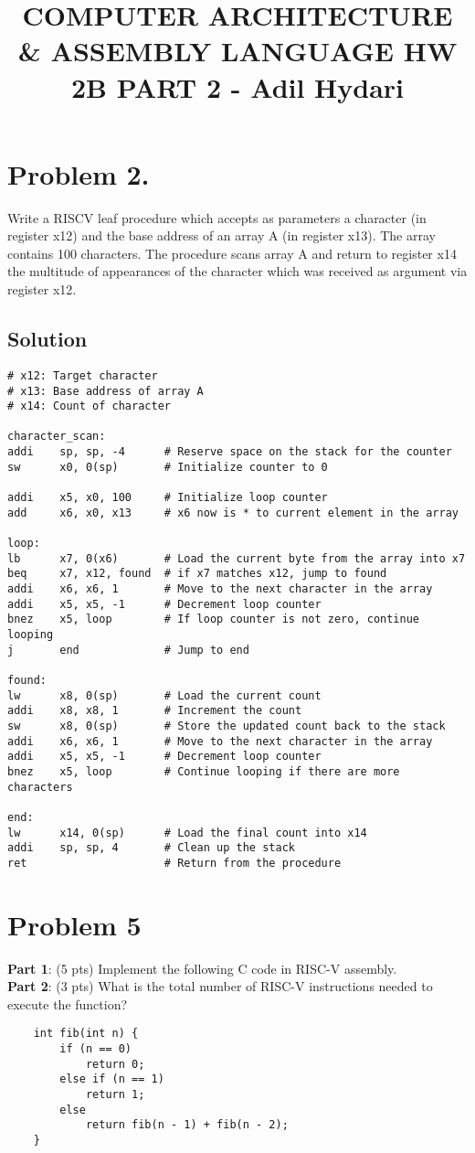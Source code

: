 \documentclass[11pt]{article}
\begin{document}
	\title{\textbf{COMPUTER ARCHITECTURE \& ASSEMBLY LANGUAGE HW 2B PART 2 - Adil Hydari}}
	\maketitle
\section*{Problem 2.}
Write a RISCV leaf procedure which accepts as parameters a character (in register x12) and the base address of an array A (in register x13). The array contains 100 characters. The procedure scans array A and return to register x14 the multitude of appearances of the character which was received as argument via register x12.
\subsection*{Solution}
\begin{lstlisting}
# x12: Target character
# x13: Base address of array A
# x14: Count of character

character_scan:
addi    sp, sp, -4      # Reserve space on the stack for the counter
sw      x0, 0(sp)       # Initialize counter to 0

addi    x5, x0, 100     # Initialize loop counter 
add     x6, x0, x13     # x6 now is * to current element in the array

loop:
lb      x7, 0(x6)       # Load the current byte from the array into x7
beq     x7, x12, found  # if x7 matches x12, jump to found
addi    x6, x6, 1       # Move to the next character in the array
addi    x5, x5, -1      # Decrement loop counter
bnez    x5, loop        # If loop counter is not zero, continue looping
j       end             # Jump to end 

found:
lw      x8, 0(sp)       # Load the current count
addi    x8, x8, 1       # Increment the count
sw      x8, 0(sp)       # Store the updated count back to the stack
addi    x6, x6, 1       # Move to the next character in the array
addi    x5, x5, -1      # Decrement loop counter
bnez    x5, loop        # Continue looping if there are more characters

end:
lw      x14, 0(sp)      # Load the final count into x14
addi    sp, sp, 4       # Clean up the stack
ret                     # Return from the procedure
\end{lstlisting}
\section*{Problem 5}
\textbf{Part 1}: (5 pts) Implement the following C code in RISC-V assembly.\\
\textbf{Part 2}: (3 pts) What is the total number of RISC-V instructions needed to execute the function?\\
\begin{lstlisting}
	int fib(int n) {
		if (n == 0)
			return 0;
		else if (n == 1)
			return 1;
		else
			return fib(n - 1) + fib(n - 2);
	}
\end{lstlisting}
\end{document}
